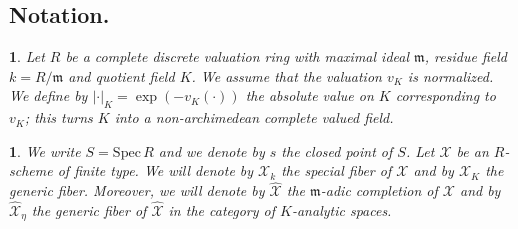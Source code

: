 \documentclass{amsart}%
\numberwithin{equation}{subsection}
\theoremstyle{plain2}
\theoremstyle{definition2}
\theoremstyle{stepstyle}
\theoremstyle{point}
\theoremstyle{subpoint}
\newtheorem{subpoint}[equation]{}%
\newcommand{\spa}[1]{\begin{subpoint}#1\end{subpoint}}           %
\newcommand{\cX}{\ensuremath{\mathscr{X}}}
\newcommand{\mm}{\ensuremath{\mathfrak{m}}}
\newcommand{\Spec}{\ensuremath{\mathrm{Spec}\,}}
\begin{document}
%
%

\subsection{Notation.}
\spa{ Let $R$ be a complete discrete
valuation ring with maximal ideal $\mm$, residue field
$k=R/\mm$ and quotient field $K$. We assume that the valuation $v_K$ is normalized. We define by $|\cdot|_K= \exp(- v_K(\cdot))$ the absolute value on $K$ corresponding to $v_K$; this turns $K$ into a non-archimedean
complete valued field.}
\spa{ We write $S=\Spec R$ and we
denote by $s$ the closed point of $S$. Let $\cX$ be an $R$-scheme of finite type. We will denote by
$\cX_k$ the special fiber of $\cX$ and by $\cX_K$ the generic
fiber. Moreover, we will denote by $\widehat{\cX}$ the
$\mm$-adic completion of $\cX$ and by $\widehat{\cX}_\eta$
the generic fiber of $\widehat{\cX}$ in the category of
$K$-analytic spaces.}
\end{document}
